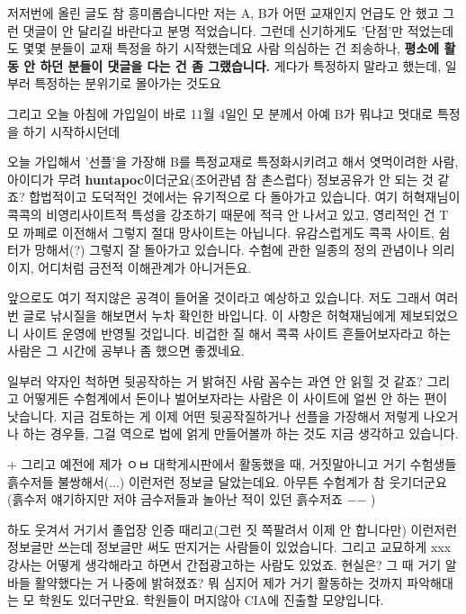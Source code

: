 저저번에 올린 글도 참 흥미롭습니다만 저는 A, B가 어떤 교재인지 언급도 안 했고 그런 댓글이 안 달리길 바란다고 분명 적었습니다.
그런데 신기하게도 '단점'만 적었는데도 몇몇 분들이 교재 특정을 하기 시작했는데요
사람 의심하는 건 죄송하나, \textbf{평소에 활동 안 하던 분들이 댓글을 다는 건 좀 그랬습니다.}
게다가 특정하지 말라고 했는데, 일부러 특정하는 분위기로 몰아가는 것도요
\vspace{5mm}

그리고 오늘 아침에 가입일이 바로 11월 4일인 모 분께서 아예 B가 뭐냐고 멋대로 특정을 하기 시작하시던데
\vspace{5mm}

오늘 가입해서 '선플'을 가장해 B를 특정교재로 특정화시키려고 해서 엿먹이려한 사람, 아이디가 무려 \textbf{huntapoc}이더군요(조어관념 참 촌스럽다)
정보공유가 안 되는 것 같죠? 합법적이고 도덕적인 것에서는 유기적으로 다 돌아가고 있습니다.
여기 허혁재님이 콕콕의 비영리사이트적 특성을 강조하기 때문에 적극 안 나서고 있고, 영리적인 건 T 모 까페로 이전해서 그렇지
절대 망사이트는 아닙니다.
유감스럽게도 콕콕 사이트, 쉼터가 망해서(?) 그렇지 잘 돌아가고 있습니다.
수험에 관한 일종의 정의 관념이나 의리이지, 어디처럼 금전적 이해관계가 아니거든요.
\vspace{5mm}

앞으로도 여기 적지않은 공격이 들어올 것이라고 예상하고 있습니다. 저도 그래서 여러번 글로 낚시질을 해보면서 누차 확인한 바입니다.
이 사항은 허혁재님에게 제보되었으니 사이트 운영에 반영될 것입니다.
비겁한 질 해서 콕콕 사이트 흔들어보자라고 하는 사람은 그 시간에 공부나 좀 했으면 좋겠네요.
\vspace{5mm}

일부러 약자인 척하면 뒷공작하는 거 밝혀진 사람 꼼수는 과연 안 읽힐 것 같죠?
그리고 어떻게든 수험계에서 돈이나 벌어보자라는 사람은 이 사이트에 얼씬 안 하는 편이 낫습니다.
지금 검토하는 게 이제 어떤 뒷공작질하거나 선플을 가장해서 저렇게 나오거나 하는 경우들,
그걸 역으로 법에 얽게 만들어볼까 하는 것도 지금 생각하고 있습니다.
\vspace{5mm}

+ 그리고 예전에 제가 ㅇㅂ 대학게시판에서 활동했을 때, 거짓말아니고 거기 수험생들 흙수저들 불쌍해서(...) 이런저런 정보글 달았는데요.
아무튼 수험계가 참 웃기더군요(흙수저 얘기하지만 저야 금수저들과 놀아난 적이 있던 흙수저죠 $-$$-$ )
\vspace{5mm}

하도 웃겨서 거기서 졸업장 인증 때리고(그런 짓 쪽팔려서 이제 안 합니다만) 이런저런 정보글만 쓰는데
정보글만 써도 딴지거는 사람들이 있었습니다. 그리고 교묘하게 xxx 강사는 어떻게 생각해라고 하면서 간접광고하는 사람도 있었죠.
현실은? 그 때 거기 알바들 활약했다는 거 나중에 밝혀졌죠?
뭐 심지어 제가 거기 활동하는 것까지 파악해대는 모 학원도 있더구만요.
학원들이 머지않아 CIA에 진출할 모양입니다.
\vspace{5mm}

